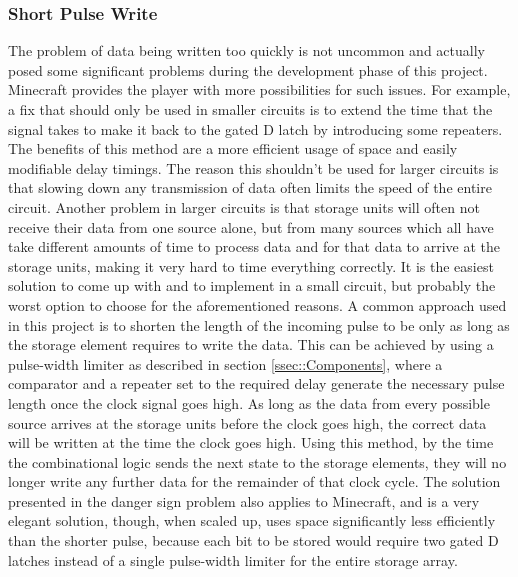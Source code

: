 \subsubsection{Short Pulse Write}
The problem of data being written too quickly is not uncommon and actually posed some significant problems during the development phase of this project. Minecraft provides the player with more possibilities for such issues. For example, a fix that should only be used in smaller circuits is to extend the time that the signal takes to make it back to the gated D latch by introducing some repeaters. The benefits of this method are a more efficient usage of space and easily modifiable delay timings. The reason this shouldn't be used for larger circuits is that slowing down any transmission of data often limits the speed of the entire circuit. Another problem in larger circuits is that storage units will often not receive their data from one source alone, but from many sources which all have take different amounts of time to process data and for that data to arrive at the storage units, making it very hard to time everything correctly. It is the easiest solution to come up with and to implement in a small circuit, but probably the worst option to choose for the aforementioned reasons. A common approach used in this project is to shorten the length of the incoming pulse to be only as long as the storage element requires to write the data. This can be achieved by using a pulse-width limiter as described in section \ref{ssec::Components}, where a comparator and a repeater set to the required delay generate the necessary pulse length once the clock signal goes high. As long as the data from every possible source arrives at the storage units before the clock goes high, the correct data will be written at the time the clock goes high. Using this method, by the time the combinational logic sends the next state to the storage elements, they will no longer write any further data for the remainder of that clock cycle.
The solution presented in the danger sign problem also applies to Minecraft, and is a very elegant solution, though, when scaled up, uses space significantly less efficiently than the shorter pulse, because each bit to be stored would require two gated D latches instead of a single pulse-width limiter for the entire storage array.

